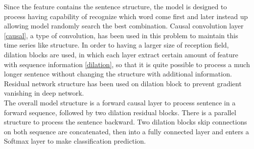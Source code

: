 Since the feature contains the sentence structure, the model is designed to process having capability of recognize which word come first and later instead up allowing model randomly search the best combination. Causal convolution layer \ref{causal}, a type of convolution, has been used in this problem to maintain this time series like structure. In order to having a larger size of reception field, dilation blocks are used, in which each layer extract certain amount of feature with sequence information \ref{dilation}, so that it is quite possible to process a much longer sentence without changing the structure with additional information. Residual network structure has been used on dilation block to prevent gradient vanishing in deep network. \\
The overall model structure is a forward causal layer to process sentence in a forward sequence, followed by two dilation residual blocks. There is a parallel structure to process the sentence backward. Two dilation blocks skip connections on both sequence are concatenated, then into a fully connected layer and enters a Softmax layer to make classification prediction.